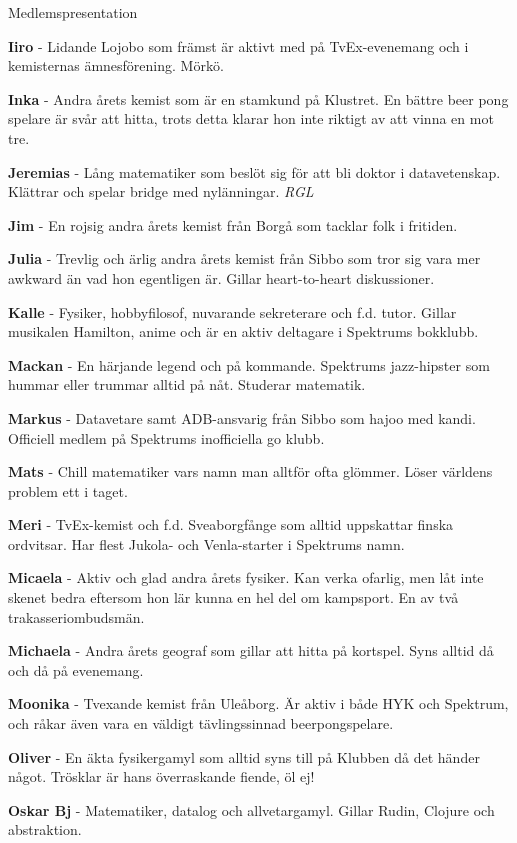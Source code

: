 \documentclass{spektraklet}
\begin{document}
\begin{artikel}{Medlemspresentation}{}
\begin{twocolumns}
\textbf{Iiro} - Lidande Lojobo som främst är aktivt med på TvEx-evenemang och i kemisternas ämnesförening. Mörkö. %

\textbf{Inka} - Andra årets kemist som är en stamkund på Klustret. En bättre beer pong spelare är svår att hitta, trots detta klarar hon inte riktigt av att vinna en mot tre. %

\textbf{Jeremias} - Lång matematiker som beslöt sig för att bli doktor i datavetenskap. Klättrar och spelar bridge med nylänningar. \emph{RGL}

\textbf{Jim} - En rojsig andra årets kemist från Borgå som tacklar folk i fritiden.

\textbf{Julia} - Trevlig och ärlig andra årets kemist från Sibbo som tror sig vara mer awkward än vad hon egentligen är. Gillar heart-to-heart diskussioner.

\textbf{Kalle} - Fysiker, hobbyfilosof, nuvarande sekreterare och f.d. tutor. Gillar musikalen Hamilton, anime och är en aktiv deltagare i Spektrums bokklubb.

\textbf{Mackan} - En härjande legend och på kommande. Spektrums jazz-hipster som hummar eller trummar alltid på nåt. Studerar matematik.

\textbf{Markus} - Datavetare samt ADB-ansvarig från Sibbo som hajoo med kandi. Officiell medlem på Spektrums inofficiella go klubb.

\textbf{Mats} -  Chill matematiker vars namn man alltför ofta glömmer. Löser världens problem ett i taget. %

\textbf{Meri} - TvEx-kemist och f.d. Sveaborgfånge som alltid uppskattar finska ordvitsar. Har flest Jukola- och Venla-starter i Spektrums namn.

\textbf{Micaela} - Aktiv och glad andra årets fysiker. Kan verka ofarlig, men låt inte skenet bedra eftersom hon lär kunna en hel del om kampsport. En av två trakasseriombudsmän.

\textbf{Michaela} - Andra årets geograf som gillar att hitta på kortspel. Syns alltid då och då på evenemang.

\textbf{Moonika} - Tvexande kemist från Uleåborg. Är aktiv i både HYK och Spektrum, och råkar även vara en väldigt tävlingssinnad beerpongspelare. %

\textbf{Oliver} - En äkta fysikergamyl som alltid syns till på Klubben då det händer något. Trösklar är hans överraskande fiende, öl ej!

\textbf{Oskar Bj} - Matematiker, datalog och allvetargamyl. Gillar Rudin, Clojure och abstraktion. %


\end{twocolumns}
\end{artikel}
\end{document}
